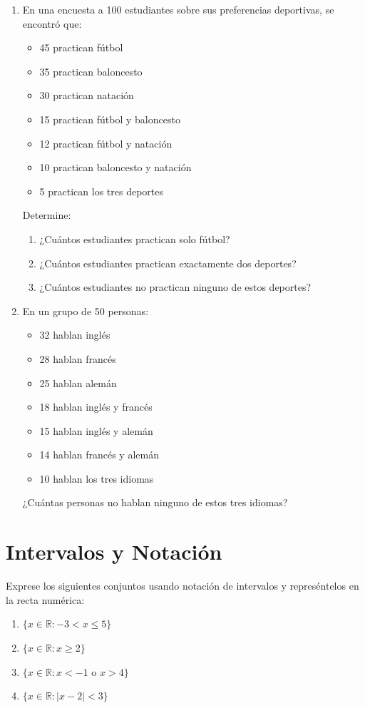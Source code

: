 \documentclass[12pt,a4paper]{article}
\begin{document}
\begin{enumerate}
    \item En una encuesta a 100 estudiantes sobre sus preferencias deportivas, se encontró que:
    \begin{itemize}
        \item 45 practican fútbol
        \item 35 practican baloncesto
        \item 30 practican natación
        \item 15 practican fútbol y baloncesto
        \item 12 practican fútbol y natación
        \item 10 practican baloncesto y natación
        \item 5 practican los tres deportes
    \end{itemize}
    Determine:
    \begin{enumerate}
        \item ¿Cuántos estudiantes practican solo fútbol?
        \item ¿Cuántos estudiantes practican exactamente dos deportes?
        \item ¿Cuántos estudiantes no practican ninguno de estos deportes?
    \end{enumerate}
    
    \item En un grupo de 50 personas:
    \begin{itemize}
        \item 32 hablan inglés
        \item 28 hablan francés
        \item 25 hablan alemán
        \item 18 hablan inglés y francés
        \item 15 hablan inglés y alemán
        \item 14 hablan francés y alemán
        \item 10 hablan los tres idiomas
    \end{itemize}
    ¿Cuántas personas no hablan ninguno de estos tres idiomas?
\end{enumerate}

\section{Intervalos y Notación}
Exprese los siguientes conjuntos usando notación de intervalos y represéntelos en la recta numérica:

\begin{enumerate}
    \item $\{x \in \mathbb{R} : -3 < x \leq 5\}$
    \item $\{x \in \mathbb{R} : x \geq 2\}$
    \item $\{x \in \mathbb{R} : x < -1 \text{ o } x > 4\}$
    \item $\{x \in \mathbb{R} : |x - 2| < 3\}$
\end{enumerate}
\end{document}

